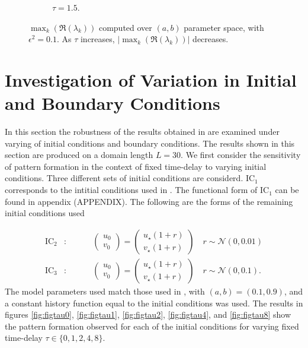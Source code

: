 \begin{figure}[H]
\begin{subfigure}[b]{0.45\textwidth}
        \caption{$\tau=1.5$.}
        \label{}
    \end{subfigure}
    \caption{$\max_k(\Re(\lambda_k))$ computed over $(a,b)$ parameter space, with $\epsilon^2=0.1$. As $\tau$ increases, $|\max_k(\Re(\lambda_k))|$ decreases.}
    \label{fig:fixbif2}
\end{figure}
\section{Investigation of Variation in Initial and Boundary Conditions}
In this section the robustness of the results obtained in \cite{gaffmonk} are examined under varying of initial conditions and boundary conditions. The results shown in this section are produced on a domain length $L=30$. We first consider the sensitivity of pattern formation in the context of fixed time-delay to varying initial conditions. Three different sets of initial conditions are considerd. $\text{IC}_1$ corresponds to the intitial conditions used in \cite{gaffmonk}. The functional form of $\text{IC}_1$ can be found in appendix (APPENDIX). The following are the forms of the remaining initial conditions used

\begin{align}
\text{IC}_2&:\quad\quad\quad\begin{pmatrix}u_0\\v_0\end{pmatrix}=\begin{pmatrix}u_\star(1+r)\\v_\star(1+r)\end{pmatrix}\quad r\sim\mathcal{N}(0,0.01)\\
\text{IC}_3&:\quad\quad\quad\begin{pmatrix}u_0\\v_0\end{pmatrix}=\begin{pmatrix}u_\star(1+r)\\v_\star(1+r)\end{pmatrix}\quad r\sim\mathcal{N}(0,0.1).
\end{align}
The model parameters used match those used in \cite{gaffmonk}, with $(a,b)=(0.1,0.9)$, and a constant history function equal to the initial conditions was used. The results in figures \ref{fig:figtau0}, \ref{fig:figtau1}, \ref{fig:figtau2}, \ref{fig:figtau4}, and \ref{fig:figtau8} show the pattern formation observed for each of the initial conditions for varying fixed time-delay $\tau\in\{0,1,2,4,8 \}$.

